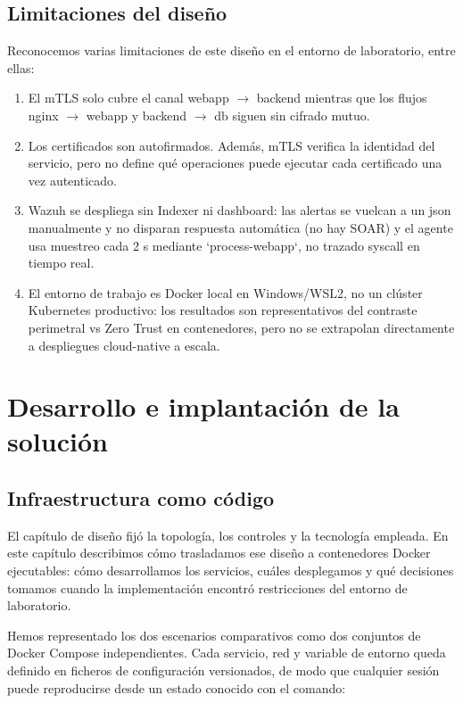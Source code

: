 \documentclass[11pt,spanish,listoffigures,listoftables]{tfgetsinf}
\begin{document}
    \section{Limitaciones del diseño}
    \label{sec:4.5}


    Reconocemos varias limitaciones de este diseño en el entorno de laboratorio, entre ellas:

    \begin{enumerate}
        \item El mTLS solo cubre el canal webapp $\rightarrow$ backend mientras que los flujos nginx $\rightarrow$ webapp y backend $\rightarrow$ db siguen sin cifrado mutuo.
        \item Los certificados son autofirmados. Además, mTLS verifica la identidad del servicio, pero no define qué operaciones puede ejecutar cada certificado una vez autenticado.
        \item Wazuh se despliega sin Indexer ni dashboard: las alertas se vuelcan a un json manualmente y no disparan respuesta automática (no hay SOAR) y el agente usa muestreo cada 2 s mediante `process-webapp`, no trazado syscall en tiempo real.
        \item El entorno de trabajo es Docker local en Windows/WSL2, no un clúster Kubernetes productivo: los resultados son representativos del contraste perimetral vs Zero Trust en contenedores, pero no se extrapolan directamente a despliegues cloud-native a escala.
    \end{enumerate}

\FloatBarrier


\chapter{Desarrollo e implantación de la solución}
    
    \section{Infraestructura como código}
    El capítulo de diseño fijó la topología, los controles y la tecnología empleada. En este capítulo describimos cómo trasladamos ese diseño a contenedores Docker ejecutables: cómo desarrollamos los servicios, cuáles desplegamos y qué decisiones tomamos cuando la implementación encontró restricciones del entorno de laboratorio.
    
    Hemos representado los dos escenarios comparativos como dos conjuntos de Docker Compose independientes. Cada servicio, red y variable de entorno queda definido en ficheros de configuración versionados, de modo que cualquier sesión puede reproducirse desde un estado conocido con el comando:
    
\end{document}
